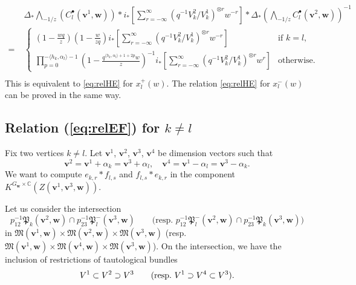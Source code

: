 \documentclass[12pt]{amsart}
\def\Bbb{\mathbb}
\def\frak{\mathfrak}
\theoremstyle{definition}
\theoremstyle{remark}
\numberwithin{equation}{subsection}
\newcommand{\C}{{\Bbb C}}
\newcommand{\M}{{\frak M}} %
\newcommand{\bv}{{\mathbf v}} %
\newcommand{\bw}{{\mathbf w}} %
\newcommand{\Pa}{{\frak P}} %
\newcommand{\Wedge}{{\textstyle \bigwedge}}
\begin{document}
\begin{equation*}
\begin{split}
 & \Delta_* \Wedge_{-1/z} (C_l^\bullet(\bv^1,\bw))\ast
  i_{*} \left[\sum_{r=-\infty}^\infty
   \left(q^{-1} V^2_k/V^1_k\right)^{\otimes r} w^{-r} \right]
  \ast \Delta_* \left(\Wedge_{-1/z} C_l^\bullet(\bv^2,\bw)\right)^{-1} \\
   =\; & 
   \begin{cases}
   {\displaystyle \left(1 - \frac{wq}z\right)\left(1 - \frac{w}{zq}\right)
   i_* \left[\sum_{r=-\infty}^\infty
     \left(q^{-1}V^2_k/V^1_k\right)^{\otimes r} w^{-r}\right]}
    & \text{if $k = l$,} \\
    {\displaystyle
    \prod_{p=0}^{-\langle h_k,\alpha_l\rangle-1}
    \left(1 - \frac{q^{\langle h_k,\alpha_l\rangle+1+2p}w}z\right)^{-1}
    i_* \left[\sum_{r=-\infty}^\infty
       \left(q^{-1}V^2_k/V^1_k\right)^{\otimes r} w^r\right]}
    & \text{otherwise.}
   \end{cases} \\
\end{split}
\end{equation*}
This is equivalent to \eqref{eq:relHE} for $x_l^+(w)$.
The relation \eqref{eq:relHE} for $x_l^-(w)$ can be proved in the same
way.

\subsection{Relation (\ref{eq:relEF}) for $k\neq l$}

Fix two vertices $k\neq l$. Let $\bv^1$, $\bv^2$, $\bv^3$, $\bv^4$ be
dimension vectors such that
\begin{equation*}
 \bv^2 = \bv^1 + \alpha_k = \bv^3 + \alpha_l, \quad
 \bv^4 = \bv^1 - \alpha_l = \bv^3 - \alpha_k.
\end{equation*}
We want to compute $e_{k,r} * f_{l,s}$ and $f_{l,s} * e_{k,r}$ in the
component $K^{G_\bw\times\C}(Z(\bv^1,\bv^3,\bw))$.

Let us consider the intersection
\begin{equation*}
  p_{12}^{-1}\Pa_k(\bv^2,\bw) \cap p_{23}^{-1}\Pa^-_{l}(\bv^3,\bw)
  \qquad\text{(resp.\ 
  $p_{12}^{-1}\Pa^-_{l}(\bv^2,\bw) \cap p_{23}^{-1}\Pa_{k}(\bv^3,\bw)$)}
\end{equation*}
in $\M(\bv^1,\bw)\times\M(\bv^2,\bw)\times\M(\bv^3,\bw)$
(resp.\ $\M(\bv^1,\bw)\times\M(\bv^4,\bw)\times\M(\bv^3,\bw)$).
On the intersection, we have the inclusion of restrictions of
tautological bundles
\begin{equation*}
   V^1 \subset V^2 \supset V^3
   \qquad\text{(resp.\
   $V^1 \supset V^4 \subset V^3$)}.
\end{equation*}
\end{document}
